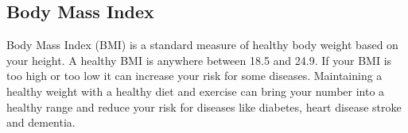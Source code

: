 \subsection{Body Mass Index}

Body Mass Index (BMI) is a standard measure of healthy body weight based on your height. A healthy BMI is anywhere between 18.5 and 24.9. If your BMI is too high or too low it can increase your risk for some diseases. Maintaining a healthy weight with a healthy diet and exercise can bring your number into a healthy range and reduce your risk for diseases like diabetes, heart disease stroke and dementia.